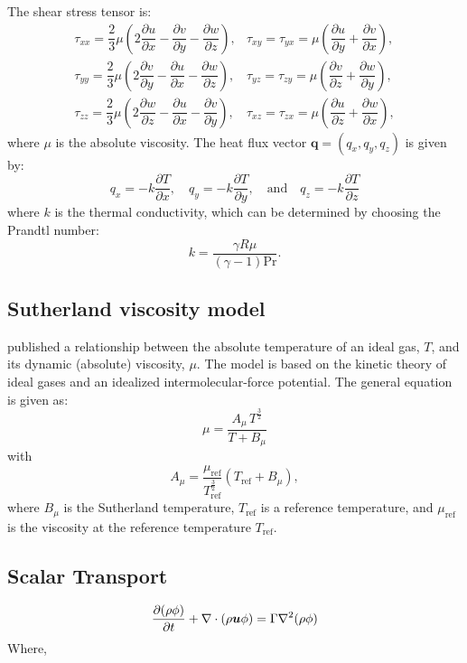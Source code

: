 \documentclass[10pt]{article}
\newcommand{\D}{\partial}
\newcommand{\diff}[2] {\dfrac{\partial #1}{\partial #2}}
\newcommand{\bv}[1]{\ensuremath{\mbox{\boldmath$ #1 $}}}
\begin{document}
The shear stress tensor is:
\begin{equation}
 \begin{array}{lll}
  \tau_{xx}= \dfrac{2}{3}  \mu \left( 2 \diff{u}{x} - \diff{v}{y} -\diff{w}{z} \right),
  &\tau_{xy}= \tau_{yx}=\mu \left( \diff{u}{y} + \diff{v}{x}\right),\\
  \tau_{yy}= \dfrac{2}{3}  \mu \left( 2 \diff{v}{y} - \diff{u}{x} -\diff{w}{z} \right),
  &\tau_{yz}= \tau_{zy}=\mu \left( \diff{v}{z} + \diff{w}{y}\right),\\
  \tau_{zz}= \dfrac{2}{3}  \mu \left( 2 \diff{w}{z} - \diff{u}{x} -\diff{v}{y} \right),
  &\tau_{xz}= \tau_{zx}=\mu \left( \diff{u}{z} + \diff{w}{x}\right),
 \end{array}
\end{equation}
where $\mu$ is the absolute viscosity. The heat flux vector $\mathbf{q}=(q_x,q_y,q_z)$ is given by:
\begin{equation}
 q_x = - k \diff{T}{x}, \quad q_y = - k \diff{T}{y}, \quad \mbox{and} \quad q_z = - k \diff{T}{z}
 \end{equation}
where $k$ is the thermal conductivity, which can be determined by choosing the Prandtl number:
$$k= \dfrac{\gamma R \mu}{ (\gamma-1) \text{Pr}}.$$

\subsection{Sutherland viscosity model}

\citet{Sutherland1893} published a relationship between the absolute temperature of an ideal gas, $T$,  and its dynamic (absolute) viscosity, $\mu$. The model is based on the kinetic theory of ideal gases and an idealized intermolecular-force potential. The general equation is given as:
\begin{equation}
\label{eq:Sutherland01}
 \mu  =\dfrac{A_\mu \, T^{\frac{3}{2}}}{T+B_\mu}
\end{equation}
with
$$    A_\mu = \dfrac{\mu_\text{ref}}{T_{\text{ref}}^{\frac{3}{2}}}(T_\text{ref} + B_\mu), $$
%
where $B_\mu$ is the Sutherland temperature, $T_{\text{ref}}$ is a reference temperature,  and $\mu_\text{ref}$ is the viscosity at the reference temperature $T_\text{ref}$.

\subsection{Scalar Transport}

\begin{equation}
\frac{\D (\rho \phi)}{\D t} + \nabla\cdot\left(\rho\bv{u}\phi\right) = \Gamma \nabla^2 (\rho \phi)
\end{equation}
Where,
\end{document}
